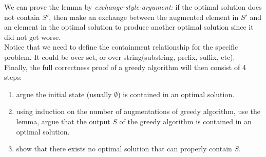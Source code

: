 \documentclass[11pt]{article}
\begin{document}
We can prove the lemma by \emph{exchange-style-argument:} if the
optimal solution does not contain $S'$, then make an exchange between
the augmented element in $S'$ and an element in the optimal solution
to produce another optimal solution since it did not get worse.\\

Notice that we need to define the containment relationship for the
specific problem. It could be over set, or over string(substring,
prefix, suffix, etc).\\

Finally, the full correctness proof of a greedy algorithm will then
consist of 4 steps:
\begin{enumerate}
\item argue the initial state (usually $\emptyset$) is contained in an
  optimal solution.
\item using induction on the number of augmentations of greedy
  algorithm, use the lemma, argue that the output $S$ of the greedy
  algorithm is contained in an optimal solution.
\item show that there exists no optimal solution that can properly
  contain $S$.
\end{enumerate}
\end{document}
